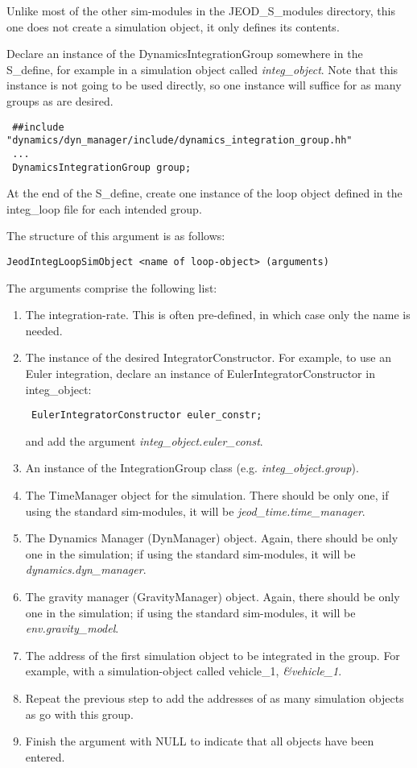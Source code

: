 Unlike most of the other sim-modules in the JEOD\_S\_modules directory, this 
one 
does not create a simulation object, it only defines its contents.

Declare an instance of the DynamicsIntegrationGroup somewhere in the 
S\_define, for example in a simulation object called \textit{integ\_object}.  Note that this instance is not going to be used directly, so one instance will suffice for as many groups as are desired.
\begin{verbatim}
 ##include "dynamics/dyn_manager/include/dynamics_integration_group.hh"
 ...
 DynamicsIntegrationGroup group;
\end{verbatim}



At the end of the S\_define, create one instance of the loop object defined in 
the integ\_loop file for each intended group.  

The structure of this argument is as follows:
\begin{verbatim}
JeodIntegLoopSimObject <name of loop-object> (arguments)
\end{verbatim}

The arguments comprise the following list:
\begin{enumerate}
 \item  The integration-rate.  This is often pre-defined, in which case only 
 the name is needed.
 \item  The instance of the desired IntegratorConstructor.  For example, to 
 use an Euler integration, declare an instance of EulerIntegratorConstructor 
 in integ\_object:
 \begin{verbatim}
 EulerIntegratorConstructor euler_constr;
  \end{verbatim}
  and add the argument \textit{integ\_object.euler\_const}.
  \item An instance of the IntegrationGroup class (e.g. 
  \textit{integ\_object.group}).
  
  \item The TimeManager object for the simulation.  There should be only one, 
  if using the standard sim-modules, it will be 
  \textit{jeod\_time.time\_manager}.
  \item The Dynamics Manager (DynManager) object.  Again, there should be only 
  one in the simulation; if using the standard sim-modules, it will be 
  \textit{dynamics.dyn\_manager}.
  
  \item The gravity manager (GravityManager) object.  Again, there should be only 
  one in the simulation; if using the standard sim-modules, it will be 
  \textit{env.gravity\_model}.
  \item The address of the first simulation object to be integrated in the 
  group.  For example, with a simulation-object called vehicle\_1, 
  \textit{\&vehicle\_1}.
  \item Repeat the previous step to add the addresses of as many simulation 
  objects as go with this group.
  \item Finish the argument with NULL to indicate that all objects have been 
  entered.
\end{enumerate}

